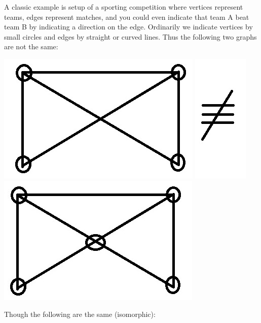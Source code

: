 \documentclass[12pt, letterpaper, onecolumn, conference, final]{IEEEtran}
\theoremstyle{definition}
\theoremstyle{plain}
\begin{document}
\noindent
A classic example is setup of a sporting competition where vertices represent teams, edges represent matches, and you could even indicate that team A beat team B by indicating a direction on the edge. Ordinarily we indicate vertices by small circles and edges by straight or curved lines. Thus the following two graphs are not the same:
\begin{center}
\includegraphics[scale=.3]{img/Graph1_1.jpg} \includegraphics[scale=.3]{img/Not_Equal.jpg} \includegraphics[scale=.3]{img/Graph1_2.jpg}
\end{center}
Though the following are the same (isomorphic):
\end{document}
